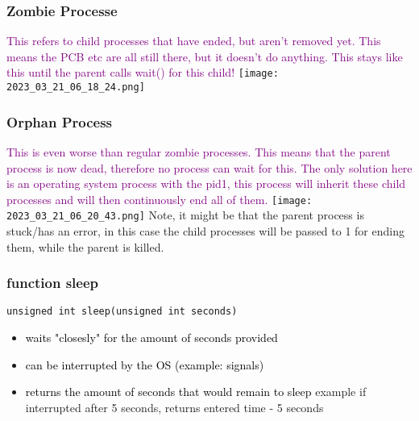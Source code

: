 \documentclass[main.tex,fontsize=8pt,paper=a4,paper=portrait,DIV=calc,]{scrartcl}
\begin{document}
\subsubsection{Zombie Processe}
\textcolor{purple}{This refers to child processes that have ended, but aren't removed yet.\newline
This means the PCB etc are all still there, but it doesn't do anything.\newline
This stays like this until the parent calls wait() for this child!}\newline
\texttt{[image: 2023\_03\_21\_06\_18\_24.png]}

\subsubsection{Orphan Process}
\textcolor{purple}{This is even worse than regular zombie processes. This means that the parent process is now dead, therefore no process can wait for this.\newline
The only solution here is an operating system process with the pid1, this process will inherit these child processes and will then continuously end all of them.}\newline
\texttt{[image: 2023\_03\_21\_06\_20\_43.png]}\newline
Note, it might be that the parent process is stuck/has an error, in this case the child processes will be passed to 1 for ending them, while the parent is killed.

\subsubsection{function sleep}
\begin{lstlisting}
unsigned int sleep(unsigned int seconds)
\end{lstlisting}
\begin{itemize}
\item \textcolor{black}{waits "closesly" for the amount of seconds provided}
\item \textcolor{black}{can be interrupted by the OS (example: signals)}
\item \textcolor{black}{returns the amount of seconds that would remain to sleep}\newline
  example if interrupted after 5 seconds, returns entered time - 5 seconds
\end{itemize} 
\end{document}
